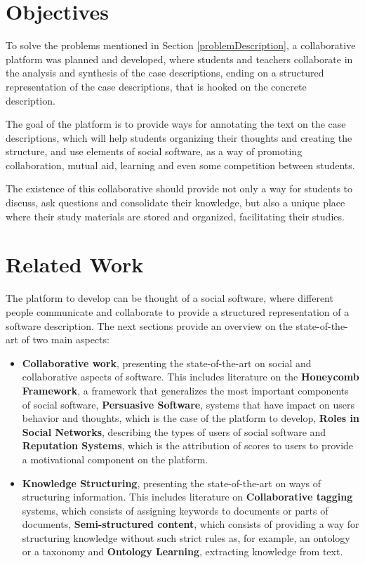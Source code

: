 \documentclass{llncs}
\begin{document}
\section{Objectives}
\label{objectives}
To solve the problems mentioned in Section \ref{problemDescription}, a collaborative platform was planned and developed, where students and teachers collaborate in the analysis and synthesis of the case descriptions, ending on a structured representation of the case descriptions, that is hooked on the concrete description. 

The goal of the platform is to provide ways for annotating the text on the case descriptions, which will help students organizing their thoughts and creating the structure, and use elements of social software, as a way of promoting collaboration, mutual aid, learning and even some competition between students.
 
The existence of this collaborative should provide not only a way for students to discuss, ask questions and consolidate their knowledge, but also a unique place where their study materials are stored and organized, facilitating their studies.

\section{Related Work}
\label{relatedWork}
The platform to develop can be thought of a social software, where different people communicate and collaborate to provide a structured representation of a software description.
The next sections provide an overview on the state-of-the-art of two main aspects:
\begin{itemize}
\item \textbf{Collaborative work}, presenting the state-of-the-art on social and collaborative aspects of software. This includes literature on the \textbf{Honeycomb Framework}, a framework that generalizes the most important components of social software, \textbf{Persuasive Software}, systems that have impact on users behavior and thoughts, which is the case of the platform to develop, \textbf{Roles in Social Networks}, describing the types of users of social software and \textbf{Reputation Systems}, which is the attribution of scores to users to provide a motivational component on the platform.
	
\item \textbf{Knowledge Structuring}, presenting the state-of-the-art on ways of structuring information. This includes literature on \textbf{Collaborative tagging }systems, which consists of assigning keywords to documents or parts of documents, \textbf{Semi-structured content}, which consists of providing a way for structuring knowledge without such strict rules as, for example, an ontology or a taxonomy and \textbf{Ontology Learning}, extracting knowledge from text.
\end{itemize}
\end{document}
